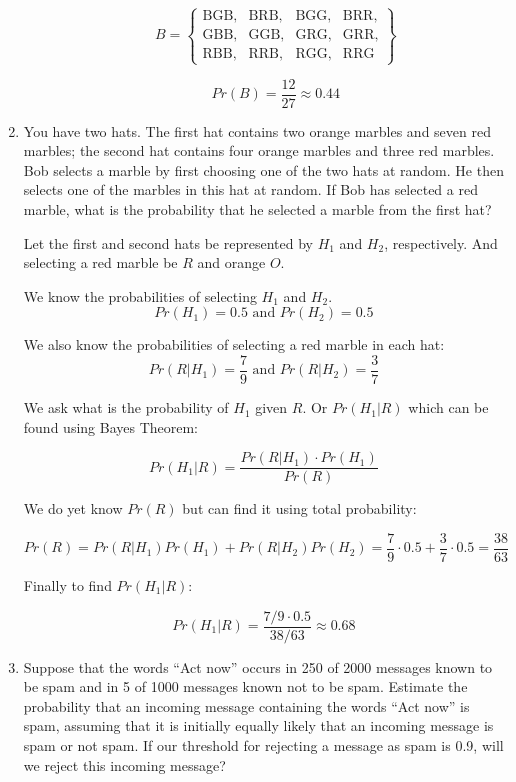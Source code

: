 \documentclass[11pt, letterpaper, includehead]{article}
\theoremstyle{plain}
\theoremstyle{mydefinition}
\theoremstyle{myproperty}
\begin{document}
\begin{enumerate}[label=\textbf{\arabic*}., leftmargin=*]
\begin{enumerate}[label=(\alph*)]
    \[
    B = \left\{
    \begin{array}{llllll}
    \text{BGB}, & \text{BRB}, & \text{BGG}, & \text{BRR}, \\ 
    \text{GBB}, & \text{GGB}, & \text{GRG}, & \text{GRR}, \\
    \text{RBB}, & \text{RRB}, & \text{RGG}, & \text{RRG}
    \end{array}
    \right\}
    \]

    \[Pr(B) = \frac{12}{27} \approx 0.44\]
\end{enumerate}

\item You have two hats. The first hat contains two orange marbles and seven red marbles; the second hat contains four orange marbles and three red marbles. Bob selects a marble by first choosing one of the two hats at random. He then selects one of the marbles in this hat at random. If Bob has selected a red marble, what is the probability that he selected a marble from the first hat?

Let the first and second hats be represented by $H_1$ and $H_2$, respectively. And selecting a red marble be $R$ and orange $O$.

We know the probabilities of selecting $H_1$ and $H_2$.
\[Pr(H_1) = 0.5 \text{ and } Pr(H_2) = 0.5\]

We also know the probabilities of selecting a red marble in each hat:
\[Pr(R|H_1) = \frac{7}{9} \text{ and } Pr(R|H_2) = \frac{3}{7}\]

We ask what is the probability of $H_1$ given $R$. Or $Pr(H_1 | R)$ which can be found using Bayes Theorem:

\[Pr(H_1|R) = \frac{Pr(R|H_1) \cdot Pr(H_1)}{Pr(R)}\]

We do yet know $Pr(R)$ but can find it using total probability:

\[Pr(R) = Pr(R|H_1)Pr(H_1) + Pr(R|H_2)Pr(H_2) = \frac{7}{9} \cdot 0.5 + \frac{3}{7} \cdot 0.5 = \frac{38}{63}\]

Finally to find $Pr(H_1 | R):$

\[Pr(H_1| R) = \frac{ 7/9 \cdot 0.5}{ 38 / 63} \approx 0.68\]

\item  Suppose that the words ``Act now'' occurs in 250 of 2000 messages known to be spam and in 5 of 1000 messages known not to be spam. Estimate the probability that an incoming message containing the words ``Act now'' is spam, assuming that it is initially equally likely that an incoming message is spam or not spam. If our threshold for rejecting a message as spam is 0.9, will we reject this incoming message?


\end{enumerate}
\end{document}
